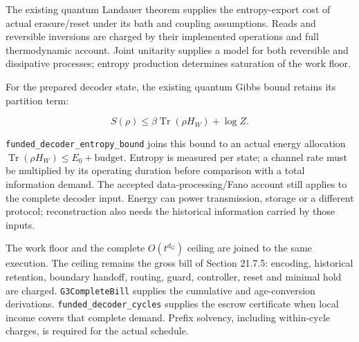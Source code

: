 \documentclass[
]{article}
\begin{document}
The existing quantum Landauer theorem supplies the entropy-export cost
of actual erasure/reset under its bath and coupling assumptions. Reads
and reversible inversions are charged by their implemented operations
and full thermodynamic account. Joint unitarity supplies a model for
both reversible and dissipative processes; entropy production determines
saturation of the work floor.

For the prepared decoder state, the existing quantum Gibbs bound retains
its partition term:

\[
S(\rho)\le \beta\operatorname{Tr}(\rho H_W)+\log Z.
\]

\texttt{f\allowbreak{}u\allowbreak{}n\allowbreak{}d\allowbreak{}e\allowbreak{}d\allowbreak{}\_\allowbreak{}d\allowbreak{}e\allowbreak{}c\allowbreak{}o\allowbreak{}d\allowbreak{}e\allowbreak{}r\allowbreak{}\_\allowbreak{}e\allowbreak{}n\allowbreak{}t\allowbreak{}r\allowbreak{}o\allowbreak{}p\allowbreak{}y\allowbreak{}\_\allowbreak{}b\allowbreak{}o\allowbreak{}u\allowbreak{}n\allowbreak{}d}
joins this bound to an actual energy allocation
\(\operatorname{Tr}(\rho H_W)\le E_0+\mathrm{budget}\). Entropy is
measured per state; a channel rate must be multiplied by its operating
duration before comparison with a total information demand. The accepted
d\allowbreak{}a\allowbreak{}t\allowbreak{}a\allowbreak{}-\allowbreak{}p\allowbreak{}r\allowbreak{}o\allowbreak{}c\allowbreak{}e\allowbreak{}s\allowbreak{}s\allowbreak{}i\allowbreak{}n\allowbreak{}g\allowbreak{}/\allowbreak{}F\allowbreak{}a\allowbreak{}n\allowbreak{}o
account still applies to the complete decoder input. Energy can power
transmission, storage or a different protocol; reconstruction also needs
the historical information carried by those inputs.

The work floor and the complete \(O(t^{d_G})\) ceiling are joined to the
same execution. The ceiling remains the gross bill of Section 21.7.5:
encoding, historical retention, boundary handoff, routing, guard,
controller, reset and minimal hold are charged. \texttt{G3CompleteBill}
supplies the cumulative and age-conversion derivations.
\texttt{f\allowbreak{}u\allowbreak{}n\allowbreak{}d\allowbreak{}e\allowbreak{}d\allowbreak{}\_\allowbreak{}d\allowbreak{}e\allowbreak{}c\allowbreak{}o\allowbreak{}d\allowbreak{}e\allowbreak{}r\allowbreak{}\_\allowbreak{}c\allowbreak{}y\allowbreak{}c\allowbreak{}l\allowbreak{}e\allowbreak{}s}
supplies the escrow certificate when local income covers that complete
demand. Prefix solvency, including within-cycle charges, is required for
the actual schedule.
\end{document}

